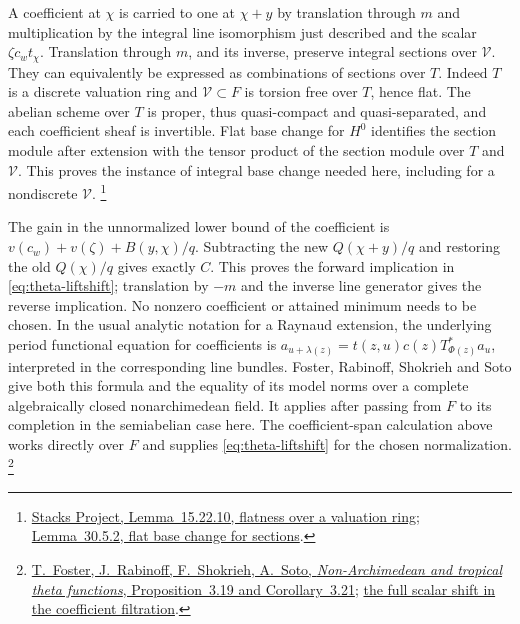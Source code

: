 A coefficient at \(\chi\) is carried to one at \(\chi+y\)
by translation through \(m\) and multiplication by the integral
line isomorphism just described and the scalar \(\zeta c_w t_\chi\).
Translation through \(m\), and its inverse, preserve integral
sections over \(\mathcal V\). They can equivalently be expressed
as combinations of sections over \(T\). Indeed \(T\) is a discrete
valuation ring and \(\mathcal V\subset F\) is torsion free over \(T\),
hence flat. The abelian scheme over \(T\) is proper, thus
quasi-compact and quasi-separated, and each coefficient sheaf is
invertible. Flat base change for \(H^0\) identifies the section
module after extension with the tensor product of the section
module over \(T\) and \(\mathcal V\). This proves the instance of
integral base change needed here, including for a nondiscrete
\(\mathcal V\).
\footnote{\href{https://stacks.math.columbia.edu/tag/0539}{Stacks Project,
Lemma~15.22.10, flatness over a valuation ring};
\href{https://stacks.math.columbia.edu/tag/02KH}{Lemma~30.5.2, flat base change for sections}.}

The gain in the unnormalized lower bound of the coefficient
is \(v(c_w)+v(\zeta)+B(y,\chi)/q\). Subtracting the new
\(Q(\chi+y)/q\) and restoring the old \(Q(\chi)/q\) gives exactly
\(C\). This proves the forward implication in
\eqref{eq:theta-liftshift}; translation by \(-m\) and the inverse
line generator gives the reverse implication. No nonzero
coefficient or attained minimum needs to be chosen. In the usual
analytic notation for a Raynaud extension, the underlying period
functional equation for coefficients is
\(a_{u+\lambda(z)}=t(z,u)c(z)T_{\Phi(z)}^*a_u\), interpreted in
the corresponding line bundles. Foster, Rabinoff, Shokrieh and Soto
give both this formula and the equality of its model norms over
a complete algebraically closed nonarchimedean field. It applies
after passing from \(F\) to its completion in the semiabelian
case here. The coefficient-span calculation above works directly
over \(F\) and supplies \eqref{eq:theta-liftshift} for the chosen
normalization.
\footnote{\href{https://arxiv.org/pdf/1705.08212}{T.~Foster,
J.~Rabinoff, F.~Shokrieh, A.~Soto, \emph{Non-Archimedean and
tropical theta functions}, Proposition~3.19 and Corollary~3.21};
\href{https://github.com/ChristianKudeba/alpoge-rh-verification/blob/alpoge-source-7cbf7a0c/src/ReciprocityTheory/ReductiveGroups/ArithmeticGeometry/DiscreteValuationRings/TWMain.lean}{the full scalar shift in the coefficient filtration}.}

